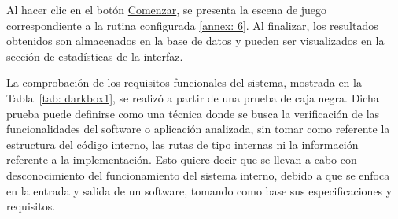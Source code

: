 Al hacer clic en el botón \underline{Comenzar}, se presenta la escena de juego correspondiente a la rutina configurada \ref{annex: 6}. Al finalizar, los resultados obtenidos son almacenados en la base de datos y pueden ser visualizados en la sección de estadísticas de la interfaz. 

La comprobación de los requisitos funcionales del sistema, mostrada en la Tabla~\ref{tab: darkbox1}, se realizó a partir de una prueba de caja negra. Dicha prueba puede definirse como una técnica donde se busca la verificación de las funcionalidades del software o aplicación analizada, sin tomar como referente la estructura del código interno, las rutas de tipo internas ni la información referente a la implementación. Esto quiere decir que se llevan a cabo con desconocimiento del funcionamiento del sistema interno, debido a que se enfoca en la entrada y salida de un software, tomando como base sus especificaciones y requisitos.    

